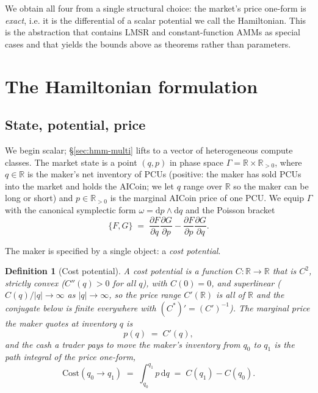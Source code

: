 \documentclass[11pt]{article}
\newtheorem{definition}{Definition}
\newcommand{\R}{\ensuremath{\mathbb{R}}}
\newcommand{\Rpos}{\ensuremath{\mathbb{R}_{>0}}}
\newcommand{\dd}{\mathrm{d}}
\newcommand{\Cstar}{\ensuremath{C^{*}}}
\begin{document}
We obtain all four from a single structural choice: the market's price one-form is
\emph{exact}, i.e. it is the differential of a scalar potential we call the
Hamiltonian. This is the abstraction that contains LMSR and constant-function AMMs
as special cases and that yields the bounds above as theorems rather than
parameters.

\section{The Hamiltonian formulation}
\label{sec:hmm-formulation}

\subsection{State, potential, price}

We begin scalar; \S\ref{sec:hmm-multi} lifts to a vector of heterogeneous compute
classes. The market state is a point $(q,p)$ in phase space
$\Gamma = \R \times \Rpos$, where $q\in\R$ is the maker's net inventory of PCUs
(positive: the maker has sold PCUs into the market and holds the AICoin; we let
$q$ range over $\R$ so the maker can be long or short) and $p\in\Rpos$ is the
marginal AICoin price of one PCU. We equip $\Gamma$ with the canonical symplectic
form $\omega = \dd p \wedge \dd q$ and the Poisson bracket
\begin{equation}
\{F,G\} \;=\; \frac{\partial F}{\partial q}\frac{\partial G}{\partial p}
            - \frac{\partial F}{\partial p}\frac{\partial G}{\partial q}.
\label{eq:bracket}
\end{equation}

The maker is specified by a single object: a \emph{cost potential}.

\begin{definition}[Cost potential]
\label{def:cost}
A \emph{cost potential} is a function $C:\R\to\R$ that is $C^2$, strictly convex
($C''(q)>0$ for all $q$), with $C(0)=0$, and superlinear
($C(q)/|q|\to\infty$ as $|q|\to\infty$, so the price range $C'(\R)$ is all of $\R$
and the conjugate below is finite everywhere with $(\Cstar)'=(C')^{-1}$). The
\emph{marginal price} the maker quotes at inventory $q$ is
\begin{equation}
p(q) \;=\; C'(q),
\label{eq:price}
\end{equation}
and the \emph{cash a trader pays} to move the maker's inventory from $q_0$ to $q_1$
is the path integral of the price one-form,
\begin{equation}
\mathrm{Cost}(q_0\!\to q_1) \;=\; \int_{q_0}^{q_1} p\,\dd q
   \;=\; C(q_1) - C(q_0).
\label{eq:cost}
\end{equation}
\end{definition}
\end{document}
